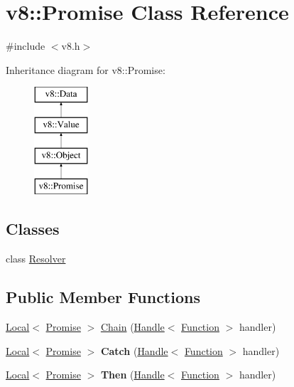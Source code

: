 \hypertarget{classv8_1_1_promise}{}\section{v8\+:\+:Promise Class Reference}
\label{classv8_1_1_promise}


{\ttfamily \#include $<$v8.\+h$>$}

Inheritance diagram for v8\+:\+:Promise\+:\begin{figure}[H]
\begin{center}
\leavevmode
\includegraphics[height=4.000000cm]{classv8_1_1_promise}
\end{center}
\end{figure}
\subsection*{Classes}
\begin{DoxyCompactItemize}
\item 
class \hyperlink{classv8_1_1_promise_1_1_resolver}{Resolver}
\end{DoxyCompactItemize}
\subsection*{Public Member Functions}
\begin{DoxyCompactItemize}
\item 
\hyperlink{classv8_1_1_local}{Local}$<$ \hyperlink{classv8_1_1_promise}{Promise} $>$ \hyperlink{classv8_1_1_promise_af56616dc11de23d6d515b0fa5d42e1eb}{Chain} (\hyperlink{classv8_1_1_handle}{Handle}$<$ \hyperlink{classv8_1_1_function}{Function} $>$ handler)
\item 
\hypertarget{classv8_1_1_promise_aab3dea5d0875e1506b9c8fc822b0e005}{}\hyperlink{classv8_1_1_local}{Local}$<$ \hyperlink{classv8_1_1_promise}{Promise} $>$ {\bfseries Catch} (\hyperlink{classv8_1_1_handle}{Handle}$<$ \hyperlink{classv8_1_1_function}{Function} $>$ handler)\label{classv8_1_1_promise_aab3dea5d0875e1506b9c8fc822b0e005}

\item 
\hypertarget{classv8_1_1_promise_a22a7ce609a7ddf0b15bf316e61b0178f}{}\hyperlink{classv8_1_1_local}{Local}$<$ \hyperlink{classv8_1_1_promise}{Promise} $>$ {\bfseries Then} (\hyperlink{classv8_1_1_handle}{Handle}$<$ \hyperlink{classv8_1_1_function}{Function} $>$ handler)\label{classv8_1_1_promise_a22a7ce609a7ddf0b15bf316e61b0178f}

\end{DoxyCompactItemize}
